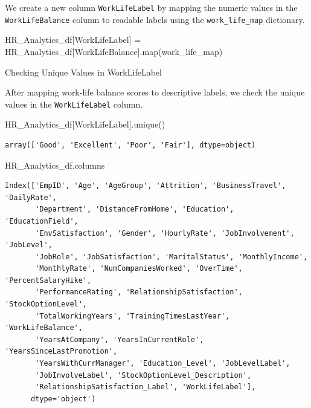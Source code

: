\documentclass[
  letterpaper,
  DIV=11,
  numbers=noendperiod]{scrartcl}
\newenvironment{Shaded}{\begin{snugshade}}{\end{snugshade}}
\newcommand{\BuiltInTok}[1]{\textcolor[rgb]{0.00,0.23,0.31}{#1}}
\newcommand{\NormalTok}[1]{\textcolor[rgb]{0.00,0.23,0.31}{#1}}
\newcommand{\OperatorTok}[1]{\textcolor[rgb]{0.37,0.37,0.37}{#1}}
\newcommand{\StringTok}[1]{\textcolor[rgb]{0.13,0.47,0.30}{#1}}
\begin{document}
We create a new column \texttt{WorkLifeLabel} by mapping the numeric
values in the \texttt{WorkLifeBalance} column to readable labels using
the \texttt{work\_life\_map} dictionary.

\begin{Shaded}
\begin{Highlighting}[]
\NormalTok{HR\_Analytics\_df[}\StringTok{\textquotesingle{}WorkLifeLabel\textquotesingle{}}\NormalTok{] }\OperatorTok{=}\NormalTok{ HR\_Analytics\_df[}\StringTok{\textquotesingle{}WorkLifeBalance\textquotesingle{}}\NormalTok{].}\BuiltInTok{map}\NormalTok{(work\_life\_map)}
\end{Highlighting}
\end{Shaded}

Checking Unique Values in WorkLifeLabel

After mapping work-life balance scores to descriptive labels, we check
the unique values in the \texttt{WorkLifeLabel} column.

\begin{Shaded}
\begin{Highlighting}[]
\NormalTok{HR\_Analytics\_df[}\StringTok{\textquotesingle{}WorkLifeLabel\textquotesingle{}}\NormalTok{].unique()}
\end{Highlighting}
\end{Shaded}

\begin{verbatim}
array(['Good', 'Excellent', 'Poor', 'Fair'], dtype=object)
\end{verbatim}

\begin{Shaded}
\begin{Highlighting}[]
\NormalTok{HR\_Analytics\_df.columns}
\end{Highlighting}
\end{Shaded}

\begin{verbatim}
Index(['EmpID', 'Age', 'AgeGroup', 'Attrition', 'BusinessTravel', 'DailyRate',
       'Department', 'DistanceFromHome', 'Education', 'EducationField',
       'EnvSatisfaction', 'Gender', 'HourlyRate', 'JobInvolvement', 'JobLevel',
       'JobRole', 'JobSatisfaction', 'MaritalStatus', 'MonthlyIncome',
       'MonthlyRate', 'NumCompaniesWorked', 'OverTime', 'PercentSalaryHike',
       'PerformanceRating', 'RelationshipSatisfaction', 'StockOptionLevel',
       'TotalWorkingYears', 'TrainingTimesLastYear', 'WorkLifeBalance',
       'YearsAtCompany', 'YearsInCurrentRole', 'YearsSinceLastPromotion',
       'YearsWithCurrManager', 'Education_Level', 'JobLevelLabel',
       'JobInvolveLabel', 'StockOptionLevel_Description',
       'RelationshipSatisfaction_Label', 'WorkLifeLabel'],
      dtype='object')
\end{verbatim}
\end{document}
